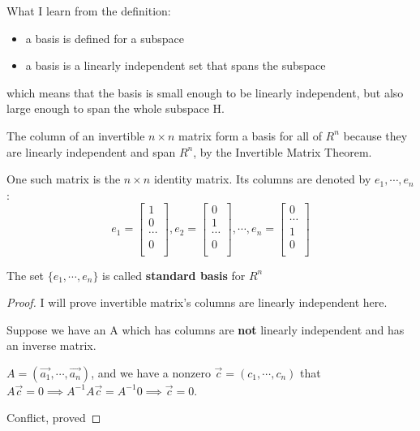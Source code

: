 \begin{remark}
    What I learn from the definition:
    \begin{itemize}
        \item a basis is defined for a subspace
        \item a basis is a linearly independent set that spans the subspace
    \end{itemize}
    which means that the basis is small enough to be linearly independent, but also large enough to span the whole subspace H.
\end{remark}

\begin{eg}
    The column of an invertible \(n \times n\) matrix form a basis for all of \(R^n\) because they are linearly independent and span \(R^n\), by the Invertible Matrix Theorem.  

    One such matrix is the \(n \times n\) identity matrix. Its columns are denoted by \(e_1, \cdots, e_n\):
    \[
        e_1 = \begin{bmatrix}
             1 \\
             0 \\
             \cdots \\
             0 \\
        \end{bmatrix},
        e_2 = \begin{bmatrix}
             0 \\
             1 \\
             \cdots \\
             0 \\
        \end{bmatrix},
        \cdots,
        e_n = \begin{bmatrix}
             0 \\
             \cdots \\
             1 \\
             0 \\
        \end{bmatrix}
    \]  

    The set \(\{e_1, \cdots, e_n\}\)  is called \textbf{standard basis} for \(R^n\)  
\end{eg}

\begin{proof}
    I will prove invertible matrix's columns are linearly independent here.

    Suppose we have an A which has columns are \textbf{not} linearly independent and has an inverse matrix.

    \(A = (\vec{a_1} , \cdots, \vec{a_n} )\), and we have a nonzero \(\vec{c} = (c_1, \cdots, c_n)\) that \(A \vec{c} = 0 \implies A^{-1}A \vec{c}  = A^{-1} 0 \implies \vec{c}  = 0\).  

    Conflict, proved
\end{proof}

